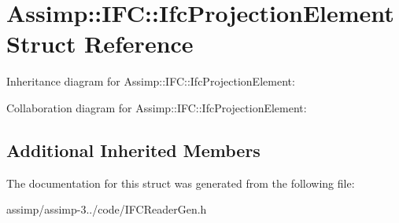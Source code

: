 \hypertarget{struct_assimp_1_1_i_f_c_1_1_ifc_projection_element}{\section{Assimp\+:\+:I\+F\+C\+:\+:Ifc\+Projection\+Element Struct Reference}
\label{struct_assimp_1_1_i_f_c_1_1_ifc_projection_element}
}


Inheritance diagram for Assimp\+:\+:I\+F\+C\+:\+:Ifc\+Projection\+Element\+:


Collaboration diagram for Assimp\+:\+:I\+F\+C\+:\+:Ifc\+Projection\+Element\+:
\subsection*{Additional Inherited Members}


The documentation for this struct was generated from the following file\+:\begin{DoxyCompactItemize}
\item 
assimp/assimp-\/3../code/I\+F\+C\+Reader\+Gen.\+h\end{DoxyCompactItemize}
